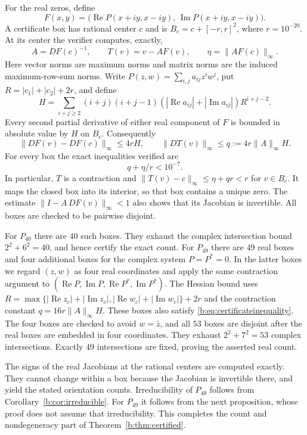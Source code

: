 \documentclass[UTF8,11pt]{ctexart}
\theoremstyle{definition}
\numberwithin{equation}{section}
\DeclareMathOperator{\Rea}{Re}\DeclareMathOperator{\Ima}{Im}
\begin{document}
For the real zeros, define
\[
 F(x,y)=\bigl(\Rea P(x+iy,x-iy),\,
                \Ima P(x+iy,x-iy)\bigr).
\]
A certificate box has rational center $c$ and is
$B_c=c+[-r,r]^2$, where $r=10^{-20}$.
At its center the verifier computes, exactly,
\[
 A=DF(c)^{-1},\qquad T(v)=v-AF(v),\qquad
 \eta=\|AF(c)\|_\infty.
\]
Here vector norms are maximum norms and matrix norms are the induced
maximum-row-sum norms. Write
$P(z,w)=\sum_{i,j}a_{ij}z^iw^j$, put
$R=|c_1|+|c_2|+2r$, and define
\[
 H=\sum_{i+j\ge2}(i+j)(i+j-1)
          (|\Rea a_{ij}|+|\Ima a_{ij}|)R^{i+j-2}.
\]
Every second partial derivative of either real component of $F$ is
bounded in absolute value by $H$ on $B_c$. Consequently
\[
 \|DF(v)-DF(c)\|_\infty\le4rH,
 \qquad \|DT(v)\|_\infty\le q:=4r\|A\|_\infty H.
\]
For every box the exact inequalities verified are
\begin{equation}\label{b:eq:certificateinequality}
 q+\eta/r<10^{-7}.
\end{equation}
In particular, $T$ is a contraction and
$\|T(v)-c\|_\infty\le\eta+qr<r$ for $v\in B_c$.
It maps the closed box into its interior, so that box contains a
unique zero. The estimate $\|I-A\,DF(v)\|_\infty<1$ also shows
that its Jacobian is invertible. All boxes are checked to be
pairwise disjoint.

For $P_{40}$ there are $40$ such boxes. They exhaust the complex
intersection bound $2^2+6^2=40$, and hence certify the exact count.
For $P_{49}$ there are $49$ real boxes and four additional boxes
for the complex system $P=P^*=0$. In the latter boxes we regard
$(z,w)$ as four real coordinates and apply the same contraction
argument to $(\Rea P,\Ima P,\Rea P^*,\Ima P^*)$.
The Hessian bound uses
$R=\max\{|\Rea z_c|+|\Ima z_c|,
          |\Rea w_c|+|\Ima w_c|\}+2r$
and the contraction constant $q=16r\|A\|_\infty H$.
These boxes also satisfy \eqref{b:eq:certificateinequality}.
The four boxes are checked to avoid $w=\bar z$, and all $53$ boxes
are disjoint after the real boxes are embedded in four coordinates.
They exhaust $2^2+7^2=53$ complex intersections. Exactly $49$
intersections are fixed, proving the asserted real count.

The signs of the real Jacobians at the rational centers are computed
exactly. They cannot change within a box because the Jacobian is
invertible there, and yield the stated orientation counts.
Irreducibility of $P_{40}$ follows from
Corollary~\ref{b:cor:irreducible}. For $P_{49}$ it follows from the
next proposition, whose proof does not assume that irreducibility.
This completes the count and nondegeneracy part of
Theorem~\ref{b:thm:certified}.
\end{document}
